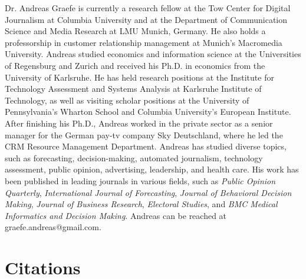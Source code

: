 \documentclass[notoc, symmetric, nobib, nols]{towcenter-guideto-book}
\newcommand{\blankpage}{\newpage\hbox{}\thispagestyle{empty}\newpage}
\begin{document}
Dr. Andreas Graefe is currently a research fellow at the Tow Center for Digital Journalism at Columbia University and at the Department of Communication Science and Media Research at LMU Munich, Germany. He also holds a professorship in customer relationship management at Munich's Macromedia University. Andreas studied economics and information science at the Universities of Regensburg and Zurich and received his Ph.D. in economics from the University of Karlsruhe. He has held research positions at the Institute for Technology Assessment and Systems Analysis at Karlsruhe Institute of Technology, as well as visiting scholar positions at the University of Pennsylvania's Wharton School and Columbia University's European Institute. After finishing his Ph.D., Andreas worked in the private sector as a senior manager for the German pay-tv company Sky Deutschland, where he led the CRM Resource Management Department. Andreas has studied diverse topics, such as forecasting, decision-making, automated journalism, technology assessment, public opinion, advertising, leadership, and health care. His work has been published in leading journals in various fields, such as \textit{Public Opinion Quarterly}, \textit{International Journal of Forecasting}, \textit{Journal of Behavioral Decision Making}, \textit{Journal of Business Research}, \textit{Electoral Studies}, and \textit{BMC Medical Informatics and Decision Making}. Andreas can be reached at graefe.andreas@gmail.com.


\chapter{Citations}
\blankpage
\theendnotes
\end{document}
